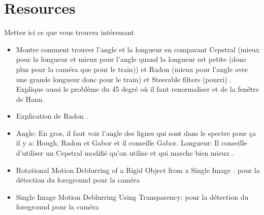 \section{Resources}
Mettez ici ce que vous trouvez intéressant
\begin{itemize}
  \item Montre comment trouver l'angle et la longueur en comparant Cepstral (mieux pour la longueur et mieux pour l'angle quand la longueur est petite (donc plus pour la caméra que pour le train)) et Radon (mieux pour l'angle avec une grande longueur donc pour le train) et Steerable filters (pourri) \cite{krahmer2006blind}.
    Explique aussi le problème du 45 degré où il faut renormaliser et de la fenêtre de Hann.
  \item Explication de Radon \cite{oliveira2007blind}.
  \item Angle: En gros, il faut voir l'angle des lignes qui sont dans le spectre pour ça il y a: Hough, Radon et Gabor et il conseille Gabor.
    Longueur: Il conseille d'utiliser un Cepstral modifié qu'on utilise et qui marche bien mieux \cite{Deshpande2014606}.
   \item  Rotational Motion Deblurring of a Rigid Object from a Single Image : pour la détection du foreground pour la caméra
   \item  Single Image Motion Deblurring Using Transparency: pour la détection du foreground pour la caméra
\end{itemize}


